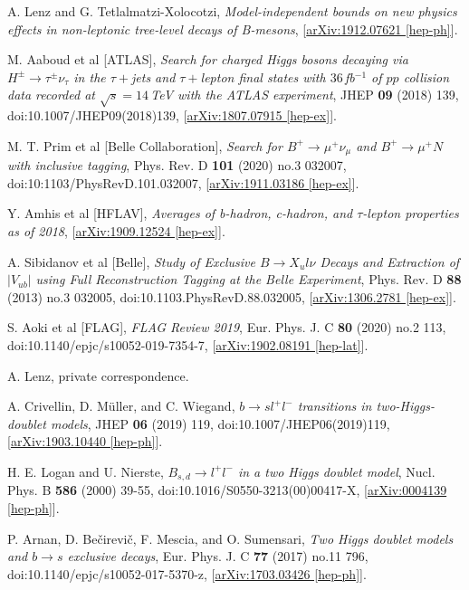 \documentclass[a4paper,12pt]{article}
\begin{document}
\begin{thebibliography}{99}
A. Lenz and G. Tetlalmatzi-Xolocotzi, \emph{Model-independent bounds on new physics effects in non-leptonic tree-level decays of B-mesons}, [\href{https://arxiv.org/abs/1912.07621}{arXiv:1912.07621 [hep-ph]}].

M. Aaboud et al [ATLAS], \emph{Search for charged Higgs bosons decaying via $H^{\pm}\to\tau^\pm\nu_\tau$ in the $\tau+$jets and $\tau+$lepton final states with $36\,$fb$^{-1}$ of $pp$ collision data recorded at $\sqrt{s}=14\,$TeV with the ATLAS experiment}, JHEP \textbf{09} (2018) 139, doi:10.1007/JHEP09(2018)139, [\href{https://arxiv.org/abs/1807.07915}{arXiv:1807.07915 [hep-ex]}].

M. T. Prim et al [Belle Collaboration], \emph{Search for $B^+\to\mu^+\nu_\mu$ and $B^+\to\mu^+N$ with inclusive tagging}, Phys. Rev. D \textbf{101} (2020) no.3 032007, doi:10:1103/PhysRevD.101.032007, [\href{https://arxiv.org/abs/1911.03186}{arXiv:1911.03186 [hep-ex]}].

Y. Amhis et al [HFLAV], \emph{Averages of b-hadron, c-hadron, and $\tau$-lepton properties as of 2018}, [\href{https://arxiv.org/abs/1909.12524}{arXiv:1909.12524 [hep-ex]}].

A. Sibidanov et al [Belle], \emph{Study of Exclusive $B\to X_ul\nu$ Decays and Extraction of $|V_{ub}|$ using Full Reconstruction Tagging at the Belle Experiment}, Phys. Rev. D \textbf{88} (2013) no.3 032005, doi:10.1103.PhysRevD.88.032005, [\href{https://arxiv.org/abs/1306.2781}{arXiv:1306.2781 [hep-ex]}].

S. Aoki et al [FLAG], \emph{FLAG Review 2019}, Eur. Phys. J. C \textbf{80} (2020) no.2 113, doi:10.1140/epjc/s10052-019-7354-7, [\href{https://arxiv.org/abs/1902.08191}{arXiv:1902.08191 [hep-lat]}].

A. Lenz, private correspondence.

A. Crivellin, D. M\"{u}ller, and C. Wiegand, \emph{$b\to sl^+l^-$ transitions in two-Higgs-doublet models}, JHEP \textbf{06} (2019) 119, doi:10.1007/JHEP06(2019)119, [\href{https://arxiv.org/abs/1903.10440}{arXiv:1903.10440 [hep-ph]}].

H. E. Logan and U. Nierste, \emph{$B_{s,d}\to l^+l^-$ in a two Higgs doublet model}, Nucl. Phys. B \textbf{586} (2000) 39-55, doi:10.1016/S0550-3213(00)00417-X, [\href{https://arxiv.org/abs/hep-ph/0004139}{arXiv:0004139 [hep-ph]}].

P. Arnan, D. Be\v{c}irevi\v{c}, F. Mescia, and O. Sumensari, \emph{Two Higgs doublet models and $b\to s$ exclusive decays}, Eur. Phys. J. C \textbf{77} (2017) no.11 796, doi:10.1140/epjc/s10052-017-5370-z, [\href{https://arxiv.org/abs/1703.03426}{arXiv:1703.03426 [hep-ph]}].


\end{thebibliography}
\end{document}
